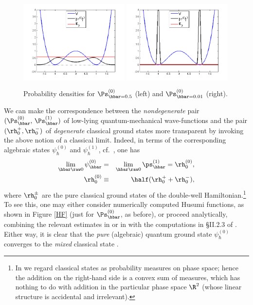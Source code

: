 \documentclass[12pt]{article}
\begin{document}
 \begin{figure}[t]
\begin{center}
\includegraphics[width=0.49\textwidth]{Kl1,hbar=0,5-1.png}
\includegraphics[width=0.49\textwidth]{KL1,hbar=0,01-1.png}
\caption{Probability densities for  $\Ps_{\hbar=0.5}^{(0)}$ (left)  and $\Ps_{\hbar=0.01}^{(0)}$ (right).}
\label{PD}
\end{center}
\end{figure}


We can make the correspondence between the \emph{nondegenerate} pair $(\Ps^{(0)}_{\hbar},\,\Ps_{\hbar}^{(1)})$  of low-lying quantum-mechanical  wave-functions and the pair $(\rh_0^+,\rh_0^-)$ of \emph{degenerate} classical ground states  more transparent  by invoking the above notion of a classical limit.  Indeed, in terms of the corresponding algebraic states $\psi^{(0)}_{\hbar}$ and  $\psi_{\hbar}^{(1)}$, cf.\ ,  one has
\begin{eqnarray}
{\lim_{\hbar\raw 0} \psi_{\hbar}^{(0)}}&=&\lim_{\hbar\raw 0} \ps^{(1)}_{\hbar}=\rh_0^{(0)}, \label{1.5} \\
\rh_0^{(0)}&\equiv& \half(\rh_0^+ + \rh_0^-), \label{1.6}
\end{eqnarray}
where $\rh_0^{\pm}$ are the pure classical ground states  of the double-well Hamiltonian.\footnote{In   we regard classical states as probability measures on phase space; hence the addition on the right-hand side is a convex sum of measures, which has nothing to do with addition in the particular phase space $\R^2$ (whose linear structure is accidental and irrelevant). } 
To see this, one may either consider numerically computed Husumi functions, as  shown in Figure \ref{HF} (just for $\Ps^{(0)}_{\hbar}$, as before), 
or proceed analytically, combining the relevant estimates in \cite{Harrell} or in \cite{Simon4} with the computations in \S II.2.3 of \cite{book}.
Either way, it is clear that
 the \emph{pure} (algebraic) quantum ground state $\psi_{\hbar}^{(0)}$
 converges to the \emph{mixed} classical state .
 
\end{document}
